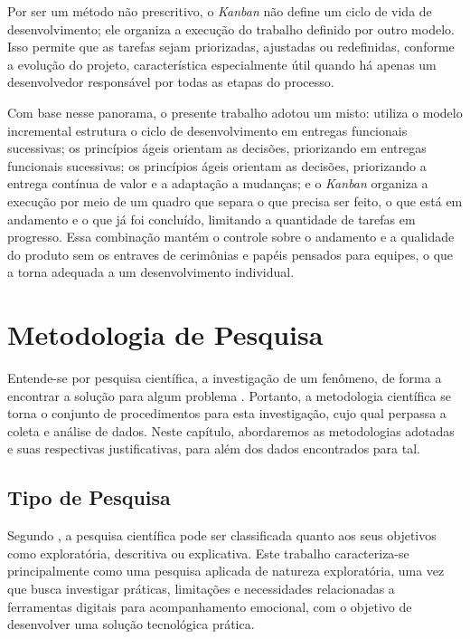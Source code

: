 Por ser um método não prescritivo, o \textit{Kanban} não define um ciclo de
vida de desenvolvimento; ele organiza a execução do trabalho definido por outro
modelo. Isso permite que as tarefas sejam priorizadas, ajustadas ou
redefinidas, conforme a evolução do projeto, característica especialmente útil
quando há apenas um desenvolvedor responsável por todas as etapas do processo.

Com base nesse panorama, o presente trabalho adotou um misto: utiliza o modelo
incremental estrutura o ciclo de desenvolvimento em entregas funcionais
sucessivas; os princípios ágeis orientam as decisões, priorizando em entregas
funcionais sucessivas; os princípios ágeis orientam as decisões, priorizando a
entrega contínua de valor e a adaptação a mudanças; e o \textit{Kanban}
organiza a execução por meio de um quadro que separa o que precisa ser feito, o
que está em andamento e o que já foi concluído, limitando a quantidade de
tarefas em progresso. Essa combinação mantém o controle sobre o andamento e a
qualidade do produto sem os entraves de cerimônias e papéis pensados para
equipes, o que a torna adequada a um desenvolvimento individual.

\section{Metodologia de Pesquisa}

Entende-se por pesquisa científica, a investigação de um fenômeno, de forma a
encontrar a solução para algum problema \cite{Coelho:2020}. Portanto, a
metodologia científica se torna o conjunto de procedimentos para esta
investigação, cujo qual perpassa a coleta e análise de dados. Neste capítulo,
abordaremos as metodologias adotadas e suas respectivas justificativas, para
além dos dados encontrados para tal.

\subsection{Tipo de Pesquisa}

Segundo \cite{Lakatos:2022}, a pesquisa científica pode ser classificada
quanto aos seus objetivos como exploratória, descritiva ou explicativa. Este
trabalho caracteriza-se principalmente como uma pesquisa aplicada de natureza
exploratória, uma vez que busca investigar práticas, limitações e necessidades
relacionadas a ferramentas digitais para acompanhamento emocional, com o
objetivo de desenvolver uma solução tecnológica prática.

